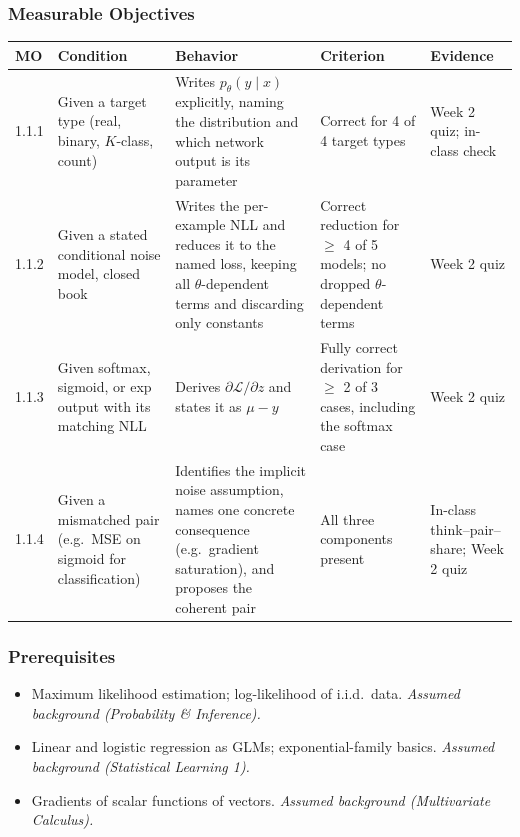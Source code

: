 \documentclass[11pt]{article}
\begin{document}
\subsubsection*{Measurable Objectives}
\begin{longtable}{@{}p{1.1cm}p{3.4cm}p{4.3cm}p{3.0cm}p{2.7cm}@{}}
\toprule
\textbf{MO} & \textbf{Condition} & \textbf{Behavior} & \textbf{Criterion} & \textbf{Evidence} \\
\midrule
\endhead
1.1.1 & Given a target type (real, binary, $K$-class, count) & Writes $p_\theta(y\mid x)$ explicitly, naming the distribution and which network output is its parameter & Correct for 4 of 4 target types & Week 2 quiz; in-class check \\
1.1.2 & Given a stated conditional noise model, closed book & Writes the per-example NLL and reduces it to the named loss, keeping all $\theta$-dependent terms and discarding only constants & Correct reduction for $\ge$ 4 of 5 models; no dropped $\theta$-dependent terms & Week 2 quiz \\
1.1.3 & Given softmax, sigmoid, or exp output with its matching NLL & Derives $\partial \mathcal{L}/\partial z$ and states it as $\mu - y$ & Fully correct derivation for $\ge$ 2 of 3 cases, including the softmax case & Week 2 quiz \\
1.1.4 & Given a mismatched pair (e.g.\ MSE on sigmoid for classification) & Identifies the implicit noise assumption, names one concrete consequence (e.g.\ gradient saturation), and proposes the coherent pair & All three components present & In-class think--pair--share; Week 2 quiz \\
\bottomrule
\end{longtable}

\subsubsection*{Prerequisites}
\begin{itemize}
  \item Maximum likelihood estimation; log-likelihood of i.i.d.\ data. \emph{Assumed background (Probability \& Inference).}
  \item Linear and logistic regression as GLMs; exponential-family basics. \emph{Assumed background (Statistical Learning 1).}
  \item Gradients of scalar functions of vectors. \emph{Assumed background (Multivariate Calculus).}
\end{itemize}
\end{document}
